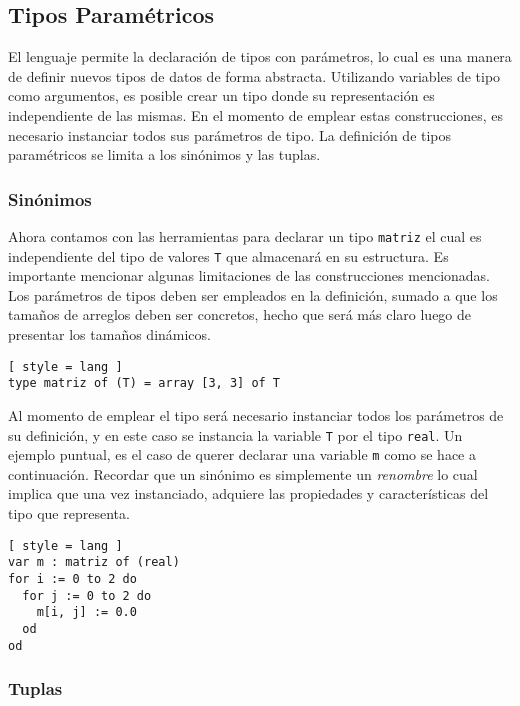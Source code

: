 \subsection{Tipos Paramétricos}

El lenguaje permite la declaración de tipos con parámetros, lo cual es una manera de definir nuevos tipos de datos de forma abstracta.
Utilizando variables de tipo como argumentos, es posible crear un tipo donde su representación es independiente de las mismas.
En el momento de emplear estas construcciones, es necesario instanciar todos sus parámetros de tipo.
La definición de tipos paramétricos se limita a los sinónimos y las tuplas.

\subsubsection{Sinónimos}

Ahora contamos con las herramientas para declarar un tipo \lstinline[style = lang]{matriz} el cual es independiente del tipo de valores \lstinline[style = lang]{T} que almacenará en su estructura.
Es importante mencionar algunas limitaciones de las construcciones mencionadas.
Los parámetros de tipos deben ser empleados en la definición, sumado a que los tamaños de arreglos deben ser concretos, hecho que será más claro luego de presentar los tamaños dinámicos.

\begin{lstlisting}[ style = lang ]
type matriz of (T) = array [3, 3] of T
\end{lstlisting}

Al momento de emplear el tipo será necesario instanciar todos los parámetros de su definición, y en este caso se instancia la variable \lstinline[style = lang]{T} por el tipo \lstinline[style = lang]{real}.
Un ejemplo puntual, es el caso de querer declarar una variable \lstinline[style = lang]{m} como se hace a continuación.
Recordar que un sinónimo es simplemente un \textit{renombre} lo cual implica que una vez instanciado, adquiere las propiedades y características del tipo que representa.

\begin{lstlisting}[ style = lang ]
var m : matriz of (real)
for i := 0 to 2 do
  for j := 0 to 2 do
    m[i, j] := 0.0
  od
od
\end{lstlisting}

\subsubsection{Tuplas}

